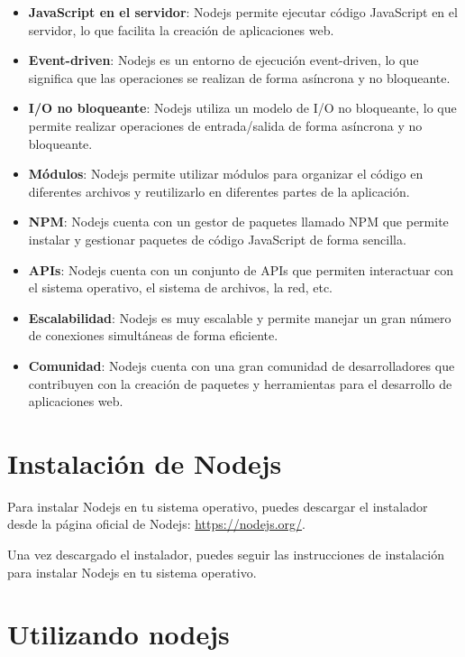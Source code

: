 \documentclass[
  a4paper,
  DIV=11,
  numbers=noendperiod,
  onepage,
  openany]{scrreprt}
\begin{document}
\begin{itemize}
\item
  \textbf{JavaScript en el servidor}: Nodejs permite ejecutar código
  JavaScript en el servidor, lo que facilita la creación de aplicaciones
  web.
\item
  \textbf{Event-driven}: Nodejs es un entorno de ejecución event-driven,
  lo que significa que las operaciones se realizan de forma asíncrona y
  no bloqueante.
\item
  \textbf{I/O no bloqueante}: Nodejs utiliza un modelo de I/O no
  bloqueante, lo que permite realizar operaciones de entrada/salida de
  forma asíncrona y no bloqueante.
\item
  \textbf{Módulos}: Nodejs permite utilizar módulos para organizar el
  código en diferentes archivos y reutilizarlo en diferentes partes de
  la aplicación.
\item
  \textbf{NPM}: Nodejs cuenta con un gestor de paquetes llamado NPM que
  permite instalar y gestionar paquetes de código JavaScript de forma
  sencilla.
\item
  \textbf{APIs}: Nodejs cuenta con un conjunto de APIs que permiten
  interactuar con el sistema operativo, el sistema de archivos, la red,
  etc.
\item
  \textbf{Escalabilidad}: Nodejs es muy escalable y permite manejar un
  gran número de conexiones simultáneas de forma eficiente.
\item
  \textbf{Comunidad}: Nodejs cuenta con una gran comunidad de
  desarrolladores que contribuyen con la creación de paquetes y
  herramientas para el desarrollo de aplicaciones web.
\end{itemize}

\section{Instalación de Nodejs}\label{instalaciuxf3n-de-nodejs}

Para instalar Nodejs en tu sistema operativo, puedes descargar el
instalador desde la página oficial de Nodejs: \url{https://nodejs.org/}.

Una vez descargado el instalador, puedes seguir las instrucciones de
instalación para instalar Nodejs en tu sistema operativo.

\section{Utilizando nodejs}\label{utilizando-nodejs}
\end{document}
